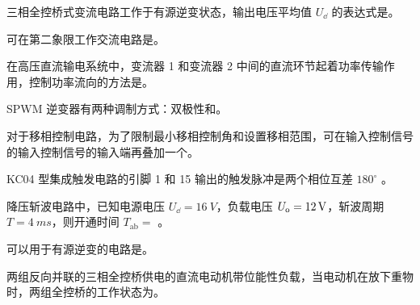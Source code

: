 \documentclass[电力电子]{subfiles}
\begin{document}
\begin{ti}
	三相全控桥式变流电路工作于有源逆变状态，输出电压平均值 $U_{\dd}$ 的表达式是。
\end{ti}

\begin{ti}
	可在第二象限工作交流电路是。
\end{ti}

\begin{ti}
	在高压直流输电系统中，变流器 1 和变流器 2 中间的直流环节起着功率传输作用，控制功率流向的方法是。
\end{ti}

\begin{ti}
	SPWM 逆变器有两种调制方式：双极性和。
\end{ti}

\begin{ti}
	对于移相控制电路，为了限制最小移相控制角和设置移相范围，可在输入控制信号的输入控制信号的输入端再叠加一个。
\end{ti}

\begin{ti}
	KC04 型集成触发电路的引脚 1 和 15 输出的触发脉冲是两个相位互差 $180^\circ$ 。
\end{ti}

\begin{ti}
	降压斩波电路中，已知电源电压 $U_{\dd} = \SI{16}{V}$，负载电压 $U_{\mathrm{o}} = \SI{12}{V}$，斩波周期 $T = \SI{4}{ms}$，则开通时间 $T_{\mathrm{ab}} = $ 。
\end{ti}

\begin{ti}
	可以用于有源逆变的电路是。
\end{ti}

\begin{ti}
	两组反向并联的三相全控桥供电的直流电动机带位能性负载，当电动机在放下重物时，两组全控桥的工作状态为。
\end{ti}
\end{document}
